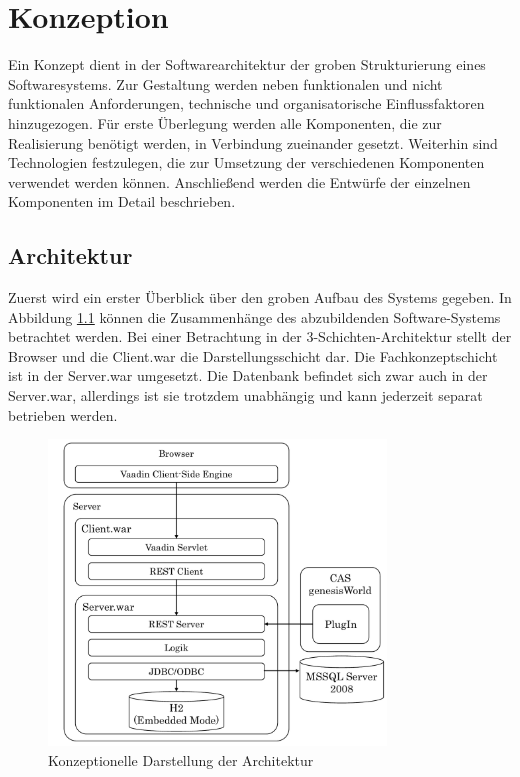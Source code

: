 
\chapter{Konzeption}
\label{ch:Konzeption}

Ein Konzept dient in der Softwarearchitektur der groben Strukturierung eines Softwaresystems. Zur Gestaltung werden neben funktionalen und nicht funktionalen Anforderungen, technische und organisatorische Einflussfaktoren hinzugezogen. Für erste Überlegung werden alle Komponenten, die zur Realisierung benötigt werden, in Verbindung zueinander gesetzt. Weiterhin sind Technologien festzulegen, die zur Umsetzung der verschiedenen Komponenten verwendet werden können. Anschließend werden die Entwürfe der einzelnen Komponenten im Detail beschrieben.  

\section{Architektur}

Zuerst wird ein erster Überblick über den groben Aufbau des Systems gegeben. In Abbildung \ref{konzept_architektur} können die Zusammenhänge des abzubildenden Software-Systems betrachtet werden. Bei einer Betrachtung in der 3-Schichten-Architektur stellt der Browser und die Client.war die Darstellungsschicht dar. Die Fachkonzeptschicht ist in der Server.war umgesetzt. Die Datenbank befindet sich zwar auch in der Server.war, allerdings ist sie trotzdem unabhängig und kann jederzeit separat betrieben werden.

\begin{figure}[htbp]
\centering
  \includegraphics[width=0.8\textwidth, width=0.8\textwidth]{pics/Konzept_architektur.pdf}
\caption{Konzeptionelle Darstellung der Architektur}
\label{konzept_architektur}
\end{figure} 

